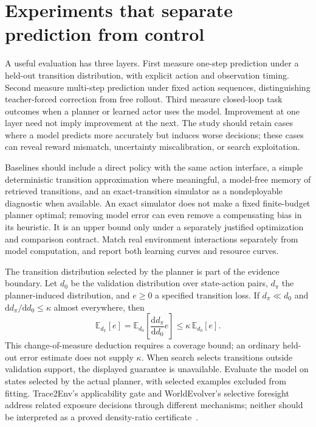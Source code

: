 \section{Experiments that separate prediction from control}
\label{sec:C06:experiments}
A useful evaluation has three layers. First measure one-step prediction under a held-out transition distribution, with explicit action and observation timing. Second measure multi-step prediction under fixed action sequences, distinguishing teacher-forced correction from free rollout. Third measure closed-loop task outcomes when a planner or learned actor uses the model. Improvement at one layer need not imply improvement at the next. The study should retain cases where a model predicts more accurately but induces worse decisions; these cases can reveal reward mismatch, uncertainty miscalibration, or search exploitation.

Baselines should include a direct policy with the same action interface, a simple deterministic transition approximation where meaningful, a model-free memory of retrieved transitions, and an exact-transition simulator as a nondeployable diagnostic when available. An exact simulator does not make a fixed finite-budget planner optimal; removing model error can even remove a compensating bias in its heuristic. It is an upper bound only under a separately justified optimization and comparison contract. Match real environment interactions separately from model computation, and report both learning curves and resource curves.

The transition distribution selected by the planner is part of the evidence boundary. Let $d_0$ be the validation distribution over state-action pairs, $d_\pi$ the planner-induced distribution, and $e\geq0$ a specified transition loss. If $d_\pi\ll d_0$ and $\mathrm d d_\pi/\mathrm d d_0\leq\kappa$ almost everywhere, then
\begin{equation}
 \mathbb E_{d_\pi}[e]
 =\mathbb E_{d_0}\!\left[
 \frac{\mathrm d d_\pi}{\mathrm d d_0}e\right]
 \leq\kappa\,\mathbb E_{d_0}[e].
\end{equation}
This change-of-measure deduction requires a coverage bound; an ordinary held-out error estimate does not supply $\kappa$. When search selects transitions outside validation support, the displayed guarantee is unavailable. Evaluate the model on states selected by the actual planner, with selected examples excluded from fitting. Trace2Env's applicability gate and WorldEvolver's selective foresight address related exposure decisions through different mechanisms; neither should be interpreted as a proved density-ratio certificate~\cite{rewrite_trace2env2026,rewrite_worldevolver2026}.

